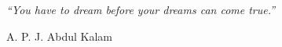 \pagestyle{plain}  %

\null\vfill
\textit{``You have to dream before your dreams can come true.''}

\begin{flushright}
A. P. J. Abdul Kalam
\end{flushright}

\vfill
\null
\clearpage  %
\thispagestyle{empty}
\begin{center}
\small{\MakeUppercase{}}%
\end{center}
\clearpage
\newpage 
